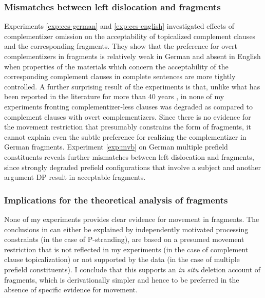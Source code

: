 \subsubsection{Mismatches between left dislocation and fragments}
Experiments \ref{exp:ccs-german} and \ref{exp:ccs-english} investigated effects of complementizer omission on the acceptability of topicalized complement clauses and the corresponding fragments. They show that the preference for overt complementizers in fragments is relatively weak in German and absent in English when properties of the materials which concern the acceptability of the corresponding complement clauses in complete sentences are more tightly controlled. A further surprising result of the experiments is that, unlike what has been reported in the literature for more than 40 years \citep{morgan1973, stowell1981, webelhuth1992, merchant2004}, in none of my experiments fronting complementizer-less clauses was degraded as compared to complement clauses with overt complementizers. Since there is no evidence for the movement restriction that presumably constrains the form of fragments, it cannot explain even the subtle preference for realizing the complementizer in German fragments. Experiment \ref{exp:mvb} on German multiple prefield constituents reveals further mismatches between left dislocation and fragments, since strongly degraded prefield configurations that involve a subject and another argument DP result in acceptable fragments.

\subsubsection{Implications for the theoretical analysis of fragments}
None of my experiments provides clear evidence for movement in fragments. The conclusions in \citet{merchant.etal2013} can either be explained by independently motivated processing constraints (in the case of P-stranding), are based on a presumed movement restriction that is not reflected in my experiments (in the case of complement clause topicalization) or not supported by the data (in the case of multiple prefield constituents). I conclude that this supports an \textit{in situ} deletion account of fragments, which is derivationally simpler and hence to be preferred in the absence of specific evidence for movement.

